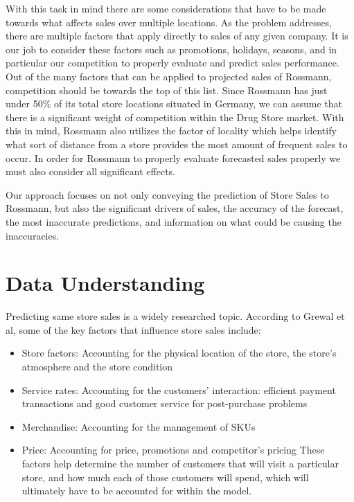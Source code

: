 \documentclass[DIV=calc, paper=a4, fontsize=11pt]{scrartcl}	 %
\begin{document}
With this task in mind there are some considerations that have to be made towards 
what affects sales over multiple locations. As the problem addresses, there are multiple factors 
that apply directly to sales of any given company. It is our job to consider these factors such as 
promotions, holidays, seasons, and in particular our competition to properly evaluate and predict sales performance. Out of the many factors 
that can be applied to projected sales of Rossmann, competition should be towards the 
top of this list. Since Rossmann has just under 50\% of its total store locations situated in 
Germany, we can assume that there is a significant weight of competition within the Drug Store 
market.  With this in mind, Rossmann also utilizes the factor of locality which helps identify 
what sort of distance from a store provides the most amount of frequent sales to occur. In 
order for Rossmann to properly evaluate forecasted sales properly we must also consider all 
significant effects.

Our approach focuses on not only conveying the prediction of Store Sales
to Rossmann, but also the significant drivers of sales, the accuracy of the 
forecast, the most inaccurate predictions, and information on what could be 
causing the inaccuracies.

\section*{Data Understanding}

Predicting same store sales is a widely researched topic. According to 
Grewal et al, some of the key factors that influence store sales include:

\begin{itemize}
\item Store factors: Accounting for the physical location of the store, the 
store’s atmosphere and the store condition
\item Service rates: Accounting for the customers' interaction: efficient 
payment transactions and good customer service for post-purchase 
problems
\item Merchandise: Accounting for the management of SKUs
\item Price: Accounting for price, promotions and competitor’s pricing 
These factors help determine the number of customers that will visit a 
particular store, and how much each of those customers will spend, which will 
ultimately have to be accounted for within the model.\cite{Grewal}
\end{itemize}
\end{document}
